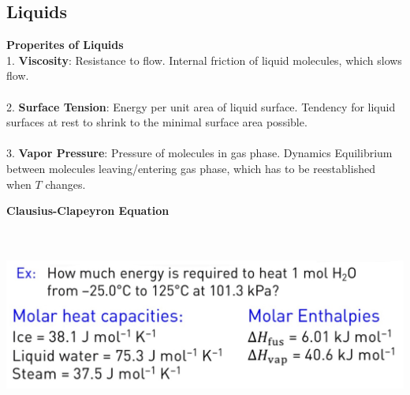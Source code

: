 \subsection{Liquids}
\textbf{Properites of Liquids}\\
1. \textbf{Viscosity}: Resistance to flow. Internal friction of liquid molecules, which slows flow.\\
\vspace{1pt}\\
2. \textbf{Surface Tension}: Energy per unit area of liquid surface. Tendency for liquid surfaces at rest to shrink to the minimal surface area possible.\\
\vspace{1pt}\\
3. \textbf{Vapor Pressure}: Pressure of molecules in gas phase. Dynamics Equilibrium between molecules leaving/entering gas phase, which has to be reestablished when $T$ changes. \\
\begin{minipage}{0.45\linewidth}
    \textbf{Clausius-Clapeyron Equation}\\
    \\
    \\
    \begin{center}
        \includegraphics[width = \linewidth]{images/heating process example.jpeg}
    \end{center}
\end{minipage}
